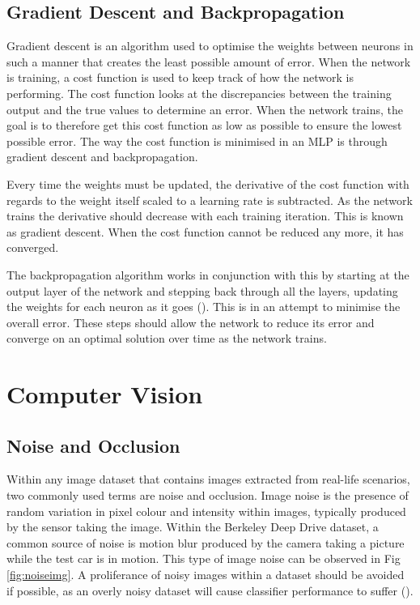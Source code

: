 \documentclass[12pt]{report}
\begin{document}
\subsection{Gradient Descent and Backpropagation}
\begin{flushleft}
Gradient descent is an algorithm used to optimise the weights between neurons in such a manner that creates the least possible amount of error. When the network is training, a cost function is used to keep track of how the network is performing. The cost function looks at the discrepancies between the training output and the true values to determine an error. When the network trains, the goal is to therefore get this cost function as low as possible to ensure the lowest possible error. The way the cost function is minimised in an MLP is through gradient descent and backpropagation.

Every time the weights must be updated, the derivative of the cost function with regards to the weight itself scaled to a learning rate is subtracted. As the network trains the derivative should decrease with each training iteration. This is known as gradient descent. When the cost function cannot be reduced any more, it has converged.

The backpropagation algorithm works in conjunction with this by starting at the output layer of the network and stepping back through all the layers, updating the weights for each neuron as it goes (\cite{rumelhart1985learning}). This is in an attempt to minimise the overall error. These steps should allow the network to reduce its error and converge on an optimal solution over time as the network trains.
\end{flushleft}

\section{Computer Vision}
\subsection{Noise and Occlusion}
\begin{flushleft}
Within any image dataset that contains images extracted from real-life scenarios, two commonly used terms are noise and occlusion. Image noise is the presence of random variation in pixel colour and intensity within images, typically produced by the sensor taking the image. Within the Berkeley Deep Drive dataset, a common source of noise is motion blur produced by the camera taking a picture while the test car is in motion. This type of image noise can be observed in Fig \ref{fig:noiseimg}. A proliferance of noisy images within a dataset should be avoided if possible, as an overly noisy dataset will cause classifier performance to suffer (\cite{xiao2015learning}).
\end{flushleft}
\end{document}
